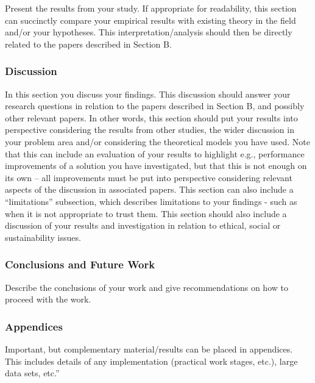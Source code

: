 Present the results from your study. If appropriate for readability, this section can succinctly compare your empirical results with existing theory in the field and/or your hypotheses. This interpretation/analysis should then be directly related to the papers described in Section B.

\subsubsection{Discussion}

In this section you discuss your findings. This discussion should answer your research questions in relation to the papers described in Section B, and possibly other relevant papers. In other words, this section should put your results into perspective considering the results from other studies, the wider discussion in your problem area and/or considering the theoretical models you have used.
Note that this can include an evaluation of your results to highlight e.g., performance improvements of a solution you have investigated, but that this is not enough on its own – all improvements must be put into perspective considering relevant aspects of the discussion in associated papers.
This section can also include a “limitations” subsection, which describes limitations to your findings - such as when it is not appropriate to trust them.
This section should also include a discussion of your results and investigation in relation to ethical, social or sustainability issues.

\subsubsection{Conclusions and Future Work}

Describe the conclusions of your work and give recommendations on how to proceed with the work.

\subsubsection{Appendices}

Important, but complementary material/results can be placed in appendices. This includes details of any implementation (practical work stages, etc.), large data sets, etc.”